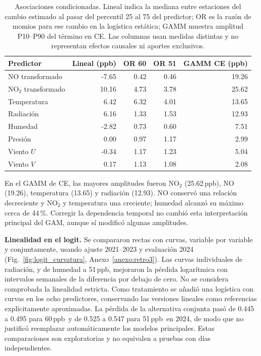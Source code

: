 \documentclass[11pt,letterpaper]{article}
\newcommand{\ppb}{\,ppb}
\newenvironment{cambio}{}{}
\begin{document}
\begin{table}[H]
\begin{cambio}\centering\small
\begin{tabular}{@{}lrrrr@{}}\toprule
Predictor & Lineal (ppb) & OR 60 & OR 51 & GAMM CE (ppb)\\\midrule
NO transformado & -7.65 & 0.42 & 0.46 & 19.26\\
NO$_2$ transformado & 10.16 & 4.73 & 3.78 & 25.62\\
Temperatura & 6.42 & 6.32 & 4.01 & 13.65\\
Radiación & 6.16 & 1.33 & 1.53 & 12.93\\
Humedad & -2.82 & 0.73 & 0.60 & 7.51\\
Presión & 0.00 & 0.97 & 1.17 & 2.99\\
Viento $U$ & -0.34 & 1.17 & 1.23 & 5.04\\
Viento $V$ & 0.17 & 1.13 & 1.08 & 2.08\\
\bottomrule\end{tabular}
\caption{Asociaciones condicionadas. Lineal indica la mediana entre estaciones del cambio estimado al pasar del percentil 25 al 75 del predictor; OR es la razón de momios para ese cambio en la logística estática; GAMM muestra amplitud P10--P90 del término en CE. Las columnas usan medidas distintas y no representan efectos causales ni aportes exclusivos.}\label{tab:variables_modelos}
\end{cambio}
\end{table}
\begin{cambio}
En el GAMM de CE, las mayores amplitudes fueron NO$_2$ (25.62\ppb), NO (19.26), temperatura (13.65) y radiación (12.93). NO conservó una relación decreciente y NO$_2$ y temperatura una creciente; humedad alcanzó su máximo cerca de 44\,\%. Corregir la dependencia temporal no cambió esta interpretación principal del GAM, aunque sí modificó algunas amplitudes.

\textbf{Linealidad en el logit.} Se compararon rectas con curvas, variable por variable y conjuntamente, usando ajuste 2021--2023 y evaluación 2024 (Fig.~\ref{fig:logit_curvatura}, Anexo~\ref{anexo:retro3}). Las curvas individuales de radiación, y de humedad a 51\ppb, mejoraron la pérdida logarítmica con intervalos semanales de la diferencia por debajo de cero. No se considera comprobada la linealidad estricta. Como tratamiento se añadió una logística con curvas en los ocho predictores, conservando las versiones lineales como referencias explícitamente aproximadas. La pérdida de la alternativa conjunta pasó de 0.445 a 0.495 para 60\ppb\ y de 0.525 a 0.547 para 51\ppb\ en 2024, de modo que no justificó reemplazar automáticamente los modelos principales. Estas comparaciones son exploratorias y no equivalen a pruebas con días independientes.
\end{cambio}
\clearpage
\end{document}
